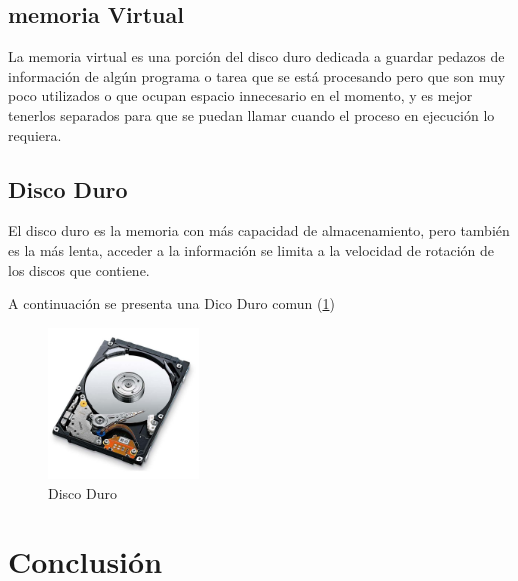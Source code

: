 \documentclass{article}
\begin{document}
\vspace{0.3cm}

\subsection{memoria Virtual}

La memoria virtual es una porción del disco duro dedicada a guardar pedazos de información de algún programa o tarea que se está procesando pero que son muy poco utilizados o que ocupan espacio innecesario en el momento, y es mejor tenerlos separados para que se puedan llamar cuando el proceso en ejecución lo requiera.

\vspace{0.3cm}

\subsection{Disco Duro}

El disco duro es la memoria con más capacidad de almacenamiento, pero también es la más lenta, acceder a la información se limita a la velocidad de rotación de los discos que contiene.

\vspace{0.6cm}

A continuación se presenta una Dico Duro comun (\ref{fig:discoduro})

\begin{figure}[h]
\includegraphics[width=4cm]{discoduro.png}
\centering
\caption{Disco Duro}
\label{fig:discoduro}
\end{figure}



\section{Conclusión} \label{conclulsion}



\end{document}
